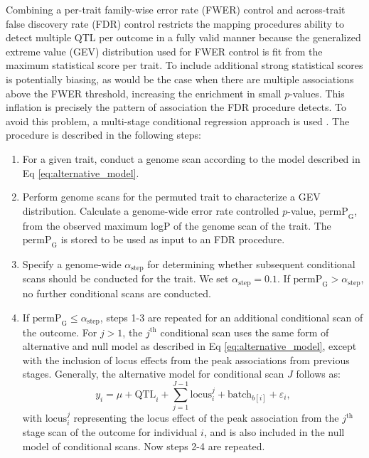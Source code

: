 \documentclass[9pt,twocolumn,twoside]{gsajnl}
\newcommand{\permpg}{\text{permP}_{\text{G}}}
\begin{document}
Combining a per-trait family-wise error rate (FWER) control and across-trait false discovery rate (FDR) control restricts the mapping procedures ability to detect multiple QTL per outcome in a fully valid manner because the generalized extreme value (GEV) distribution used for FWER control is fit from the maximum statistical score per trait. To include additional strong statistical scores is potentially biasing, as would be the case when there are multiple associations above the FWER threshold, increasing the enrichment in small $p$-values. This inflation is precisely the pattern of association the FDR procedure detects. To avoid this problem, a multi-stage conditional regression approach is used \citep{Jansen2017}. The procedure is described in the following steps:
\begin{enumerate}
    \item For a given trait, conduct a genome scan according to the model described in Eq \ref{eq:alternative_model}.
    \item Perform genome scans for the permuted trait to characterize a GEV distribution. Calculate a genome-wide error rate controlled $p$-value, $\permpg$, from the observed maximum logP of the genome scan of the trait. The $\permpg$ is stored to be used as input to an FDR procedure.
    \item Specify a genome-wide $\alpha_{\text{step}}$ for determining whether subsequent conditional scans should be conducted for the trait. We set $\alpha_{\text{step}} = 0.1$. If $\permpg > \alpha_{\text{step}}$, no further conditional scans are conducted.
    \item If $\permpg \le \alpha_{\text{step}}$, steps 1-3 are repeated for an additional conditional scan of the outcome. For $j > 1$, the $j^{\text{th}}$ conditional scan uses the same form of alternative and null model as described in Eq \ref{eq:alternative_model}, except with the inclusion of locus effects from the peak associations from previous stages. Generally, the alternative model for conditional scan $J$ follows as:
\begin{equation}
y_{i} = \mu + \text{QTL}_{i} + \sum_{j=1}^{J-1}\text{locus}_{i}^{j} + \text{batch}_{b[i]} + \varepsilon_{i},
\label{eq:conditional_model}
\end{equation}
with $\text{locus}_{i}^{j}$ representing the locus effect of the peak association from the $j^{\text{th}}$ stage scan of the outcome for individual $i$, and is also included in the null model of conditional scans. Now steps 2-4 are repeated.
\end{enumerate}
\end{document}
